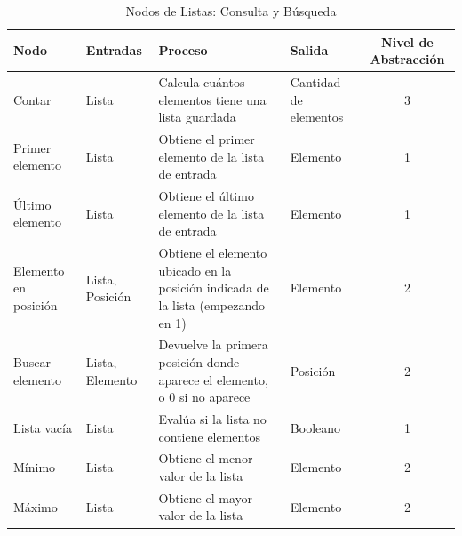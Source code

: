 \begin{table}[H]
    \centering
    \caption{Nodos de Listas: Consulta y Búsqueda}
    \begin{tabularx}{\textwidth}{ l l X X c }
        \hline
        \textbf{Nodo}        & \textbf{Entradas} & \textbf{Proceso}                                                                 & \textbf{Salida}       & \textbf{Nivel de Abstracción} \\ \hline
        Contar               & Lista             & Calcula cuántos elementos tiene una lista guardada                               & Cantidad de elementos & 3                             \\
        Primer elemento      & Lista             & Obtiene el primer elemento de la lista de entrada                                & Elemento              & 1                             \\
        Último elemento      & Lista             & Obtiene el último elemento de la lista de entrada                                & Elemento              & 1                             \\
        Elemento en posición & Lista, Posición   & Obtiene el elemento ubicado en la posición indicada de la lista (empezando en 1) & Elemento              & 2                             \\
        Buscar elemento      & Lista, Elemento   & Devuelve la primera posición donde aparece el elemento, o 0 si no aparece        & Posición              & 2                             \\
        Lista vacía          & Lista             & Evalúa si la lista no contiene elementos                                         & Booleano              & 1                             \\
        Mínimo               & Lista             & Obtiene el menor valor de la lista                                               & Elemento              & 2                             \\
        Máximo               & Lista             & Obtiene el mayor valor de la lista                                               & Elemento              & 2                             \\
        \hline
    \end{tabularx}
\end{table}

